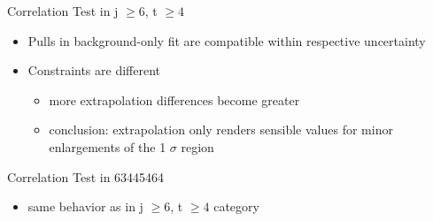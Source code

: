 \begin{frame}{Correlation Test in j $\geq 6$, t $\geq 4$}

\begin{itemize}
\item Pulls in background-only fit are compatible within respective uncertainty\\
\item Constraints are different
\begin{itemize}
\item more extrapolation \rar differences become greater
\item conclusion: extrapolation only renders sensible values for minor enlargements of the 1 $\sigma$ region
\end{itemize}
\end{itemize}
\end{frame}

\begin{frame}{Correlation Test in 63445464}

\begin{itemize}
\item same behavior as in j $\geq 6$, t $\geq 4$ category
\end{itemize}
\end{frame}
